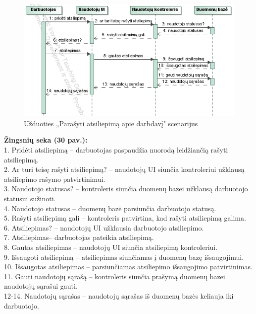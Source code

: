 \documentclass{VUMIFPSkursinis}
\begin{document}
\begin{figure}[H]
\centering
\includegraphics[width=\linewidth, frame]{img/seku(darbuotojoatsiliepimas).png}
\caption{Užduoties „Parašyti atsiliepimą apie darbdavį" scenarijus}
\end{figure}
	\textbf{Žingsnių seka (30 pav.):}\\
	1. Pridėti atsiliepimą – darbuotojas paspaudžia nuorodą leidžiančią rašyti atsiliepimą.\\
	2. Ar turi teisę rašyti atsiliepimą? – naudotojų UI siunčia kontroleriui užklausą atsiliepimo rašymo patvirtinimui.\\
	3. Naudotojo statusas? – kontroleris siunčia duomenų bazei užklausą darbuotojo statusui sužinoti.\\
	4. Naudotojo statusas – duomenų bazė parsiunčia darbuotojo statusą.\\
	5. Rašyti atsiliepimą gali – kontroleris patvirtina, kad rašyti atsiliepimą galima.\\
	6. Atsiliepimas? – naudotojų UI užklausia darbuotojo atsiliepimo.\\
	7. Atsiliepimas– darbuotojas pateikia atsiliepimą.\\
	8. Gautas atsiliepimas – naudotojų UI siunčia atsiliepimą kontroleriui.\\
	9. Išsaugoti atsiliepimą – atsiliepimas siunčiamas į duomenų bazę išsaugojimui.\\
	10. Išsaugotas atsiliepimas – parsiunčiamas atsiliepimo išsaugojimo patvirtinimas.\\
	11. Gauti naudotojų sąrašą – kontroleris siunčia prašymą duomenų bazei naudotojų sąrašui gauti.\\
	12-14. Naudotojų sąrašas – naudotojų sąrašas iš duomenų bazės keliauja iki darbuotojo.\\
%
\end{document}
